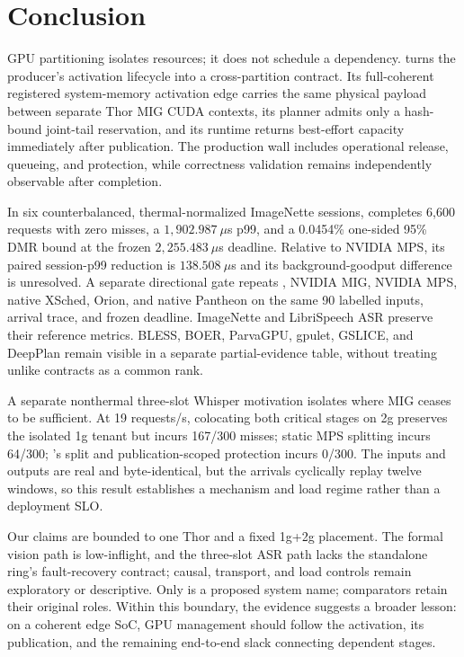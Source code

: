 \section{Conclusion}
\label{sec:conclusion}

GPU partitioning isolates resources; it does not schedule a dependency.
\sys turns the producer's activation lifecycle into a cross-partition
contract.  Its full-coherent registered system-memory activation edge carries
the same physical payload between separate Thor MIG CUDA contexts, its planner
admits only a hash-bound joint-tail reservation, and its runtime returns
best-effort capacity immediately after publication.  The production wall
includes operational release, queueing, and protection, while correctness
validation remains independently observable after completion.

In six counterbalanced, thermal-normalized ImageNette sessions, \sys completes
6,600 requests with zero misses, a $1{,}902.987~\mu$s p99, and a 0.0454\%
one-sided 95\% DMR bound at the frozen $2{,}255.483~\mu$s deadline.  Relative
to NVIDIA MPS, its paired session-p99 reduction is $138.508~\mu$s and its
background-goodput difference is unresolved.  A separate directional gate
repeats \sys, NVIDIA MIG, NVIDIA MPS, native XSched, Orion, and native Pantheon
on the same 90 labelled inputs, arrival trace, and frozen deadline.  ImageNette
and LibriSpeech ASR preserve their reference metrics.  BLESS, BOER, ParvaGPU,
gpulet, GSLICE, and DeepPlan remain visible in a separate partial-evidence
table, without treating unlike contracts as a common rank.

A separate nonthermal three-slot Whisper motivation isolates where MIG ceases
to be sufficient.  At 19 requests/s, colocating both critical stages on 2g
preserves the isolated 1g tenant but incurs 167/300 misses; static MPS splitting
incurs 64/300; \sys's split and publication-scoped protection incurs 0/300.
The inputs and outputs are real and byte-identical, but the arrivals cyclically
replay twelve windows, so this result establishes a mechanism and load regime
rather than a deployment SLO.

Our claims are bounded to one Thor and a fixed 1g+2g placement.  The formal
vision path is low-inflight, and the three-slot ASR path lacks the standalone
ring's fault-recovery contract; causal, transport, and load controls remain
exploratory or descriptive.  Only \sys is a proposed system name; comparators
retain their original roles.  Within this boundary, the evidence suggests a broader lesson:
on a coherent edge SoC, GPU management should follow the activation, its
publication, and the remaining end-to-end slack connecting dependent stages.
